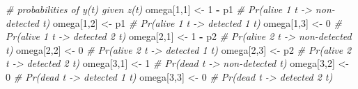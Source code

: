 \documentclass[
  12pt,
]{krantz}
\newenvironment{Shaded}{\begin{snugshade}}{\end{snugshade}}
\newcommand{\CommentTok}[1]{\textcolor[rgb]{0.56,0.35,0.01}{\textit{#1}}}
\newcommand{\DecValTok}[1]{\textcolor[rgb]{0.00,0.00,0.81}{#1}}
\newcommand{\NormalTok}[1]{#1}
\newcommand{\OtherTok}[1]{\textcolor[rgb]{0.56,0.35,0.01}{#1}}
\newcommand{\SpecialCharTok}[1]{\textcolor[rgb]{0.81,0.36,0.00}{\textbf{#1}}}
\begin{document}
\begin{Shaded}
\begin{Highlighting}[]
  \CommentTok{\# probabilities of y(t) given z(t)}
\NormalTok{  omega[}\DecValTok{1}\NormalTok{,}\DecValTok{1}\NormalTok{] }\OtherTok{\textless{}{-}} \DecValTok{1} \SpecialCharTok{{-}}\NormalTok{ p1     }\CommentTok{\# Pr(alive 1 t {-}\textgreater{} non{-}detected t)}
\NormalTok{  omega[}\DecValTok{1}\NormalTok{,}\DecValTok{2}\NormalTok{] }\OtherTok{\textless{}{-}}\NormalTok{ p1        }\CommentTok{\# Pr(alive 1 t {-}\textgreater{} detected 1 t)}
\NormalTok{  omega[}\DecValTok{1}\NormalTok{,}\DecValTok{3}\NormalTok{] }\OtherTok{\textless{}{-}} \DecValTok{0}          \CommentTok{\# Pr(alive 1 t {-}\textgreater{} detected 2 t)}
\NormalTok{  omega[}\DecValTok{2}\NormalTok{,}\DecValTok{1}\NormalTok{] }\OtherTok{\textless{}{-}} \DecValTok{1} \SpecialCharTok{{-}}\NormalTok{ p2     }\CommentTok{\# Pr(alive 2 t {-}\textgreater{} non{-}detected t)}
\NormalTok{  omega[}\DecValTok{2}\NormalTok{,}\DecValTok{2}\NormalTok{] }\OtherTok{\textless{}{-}} \DecValTok{0}          \CommentTok{\# Pr(alive 2 t {-}\textgreater{} detected 1 t)}
\NormalTok{  omega[}\DecValTok{2}\NormalTok{,}\DecValTok{3}\NormalTok{] }\OtherTok{\textless{}{-}}\NormalTok{ p2         }\CommentTok{\# Pr(alive 2 t {-}\textgreater{} detected 2 t)}
\NormalTok{  omega[}\DecValTok{3}\NormalTok{,}\DecValTok{1}\NormalTok{] }\OtherTok{\textless{}{-}} \DecValTok{1}          \CommentTok{\# Pr(dead t {-}\textgreater{} non{-}detected t)}
\NormalTok{  omega[}\DecValTok{3}\NormalTok{,}\DecValTok{2}\NormalTok{] }\OtherTok{\textless{}{-}} \DecValTok{0}          \CommentTok{\# Pr(dead t {-}\textgreater{} detected 1 t)}
\NormalTok{  omega[}\DecValTok{3}\NormalTok{,}\DecValTok{3}\NormalTok{] }\OtherTok{\textless{}{-}} \DecValTok{0}          \CommentTok{\# Pr(dead t {-}\textgreater{} detected 2 t)}
  

\end{Highlighting}
\end{Shaded}
\end{document}
